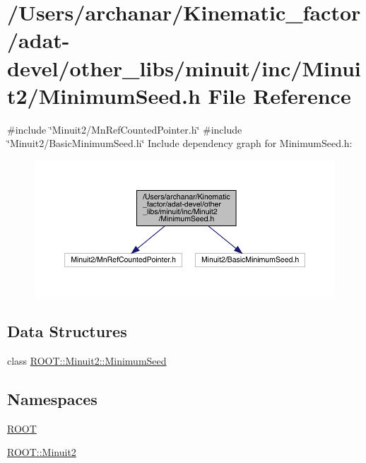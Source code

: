 \hypertarget{adat-devel_2other__libs_2minuit_2inc_2Minuit2_2MinimumSeed_8h}{}\section{/\+Users/archanar/\+Kinematic\+\_\+factor/adat-\/devel/other\+\_\+libs/minuit/inc/\+Minuit2/\+Minimum\+Seed.h File Reference}
\label{adat-devel_2other__libs_2minuit_2inc_2Minuit2_2MinimumSeed_8h}
{\ttfamily \#include \char`\"{}Minuit2/\+Mn\+Ref\+Counted\+Pointer.\+h\char`\"{}}\newline
{\ttfamily \#include \char`\"{}Minuit2/\+Basic\+Minimum\+Seed.\+h\char`\"{}}\newline
Include dependency graph for Minimum\+Seed.\+h\+:
\nopagebreak
\begin{figure}[H]
\begin{center}
\leavevmode
\includegraphics[width=350pt]{db/d75/adat-devel_2other__libs_2minuit_2inc_2Minuit2_2MinimumSeed_8h__incl}
\end{center}
\end{figure}
\subsection*{Data Structures}
\begin{DoxyCompactItemize}
\item 
class \mbox{\hyperlink{classROOT_1_1Minuit2_1_1MinimumSeed}{R\+O\+O\+T\+::\+Minuit2\+::\+Minimum\+Seed}}
\end{DoxyCompactItemize}
\subsection*{Namespaces}
\begin{DoxyCompactItemize}
\item 
 \mbox{\hyperlink{namespaceROOT}{R\+O\+OT}}
\item 
 \mbox{\hyperlink{namespaceROOT_1_1Minuit2}{R\+O\+O\+T\+::\+Minuit2}}
\end{DoxyCompactItemize}
